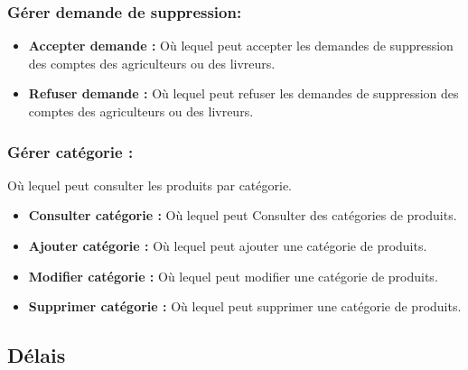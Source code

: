\documentclass[16pt,fleqn]{article} %
\begin{document}
\subsubsection{Gérer demande de suppression:}
\begin{itemize}
    \item \textbf{Accepter demande :} Où lequel peut accepter les demandes de suppression des comptes des agriculteurs ou des livreurs.
    \item \textbf{Refuser demande :} Où lequel peut refuser les demandes de suppression des comptes des agriculteurs ou des livreurs.
\end{itemize}


\subsubsection{Gérer catégorie :}
Où lequel peut consulter les produits par catégorie.
    \begin{itemize}
        \item \textbf{Consulter catégorie :} Où lequel peut Consulter des catégories de produits.
        \item \textbf{Ajouter catégorie :} Où lequel peut ajouter une catégorie de produits.
        \item \textbf{Modifier catégorie :} Où lequel peut modifier une catégorie de produits.
        \item \textbf{Supprimer catégorie :} Où lequel peut supprimer une catégorie de produits.
    \end{itemize}
    
\subsection{Délais}
\end{document}
